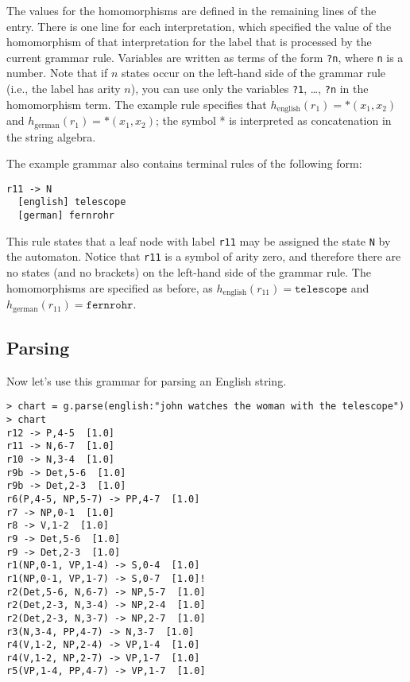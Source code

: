 \documentclass[11pt]{article}
\begin{document}
The values for the homomorphisms are defined in the remaining lines of
the entry. There is one line for each interpretation, which specified
the value of the homomorphism of that interpretation for the label
that is processed by the current grammar rule.  Variables are written
as terms of the form \texttt{?n}, where \verb?n? is a number. Note
that if $n$ states occur on the left-hand side of the grammar rule
(i.e., the label has arity $n$), you can use only the variables
\texttt{?1}, \ldots, \texttt{?n} in the homomorphism term. The example
rule specifies that $h_\mathrm{english}(r_1) = *(x_1,x_2)$ and
$h_\mathrm{german}(r_1) = *(x_1,x_2)$; the symbol * is interpreted as
concatenation in the string algebra.

The example grammar also contains terminal rules of the following
form:

\begin{verbatim}
r11 -> N
  [english] telescope
  [german] fernrohr
\end{verbatim}

This rule states that a leaf node with label \verb?r11? may be
assigned the state \verb?N? by the automaton. Notice that \verb?r11?
is a symbol of arity zero, and therefore there are no states (and no
brackets) on the left-hand side of the grammar rule. The homomorphisms
are specified as before, as $h_\mathrm{english}(r_{11}) =
\mathtt{telescope}$ and $h_\mathrm{german}(r_{11}) =
\mathtt{fernrohr}$.


\subsection{Parsing}

Now let's use this grammar for parsing an English string.

\begin{verbatim}
> chart = g.parse(english:"john watches the woman with the telescope")
> chart
r12 -> P,4-5  [1.0]
r11 -> N,6-7  [1.0]
r10 -> N,3-4  [1.0]
r9b -> Det,5-6  [1.0]
r9b -> Det,2-3  [1.0]
r6(P,4-5, NP,5-7) -> PP,4-7  [1.0]
r7 -> NP,0-1  [1.0]
r8 -> V,1-2  [1.0]
r9 -> Det,5-6  [1.0]
r9 -> Det,2-3  [1.0]
r1(NP,0-1, VP,1-4) -> S,0-4  [1.0]
r1(NP,0-1, VP,1-7) -> S,0-7  [1.0]!
r2(Det,5-6, N,6-7) -> NP,5-7  [1.0]
r2(Det,2-3, N,3-4) -> NP,2-4  [1.0]
r2(Det,2-3, N,3-7) -> NP,2-7  [1.0]
r3(N,3-4, PP,4-7) -> N,3-7  [1.0]
r4(V,1-2, NP,2-4) -> VP,1-4  [1.0]
r4(V,1-2, NP,2-7) -> VP,1-7  [1.0]
r5(VP,1-4, PP,4-7) -> VP,1-7  [1.0]
\end{verbatim}
\end{document}
